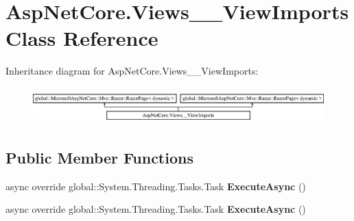 \hypertarget{class_asp_net_core_1_1_views_____view_imports}{}\section{Asp\+Net\+Core.\+Views\+\_\+\+\_\+\+View\+Imports Class Reference}
\label{class_asp_net_core_1_1_views_____view_imports}
Inheritance diagram for Asp\+Net\+Core.\+Views\+\_\+\+\_\+\+View\+Imports\+:\begin{figure}[H]
\begin{center}
\leavevmode
\includegraphics[height=1.432225cm]{class_asp_net_core_1_1_views_____view_imports}
\end{center}
\end{figure}
\subsection*{Public Member Functions}
\begin{DoxyCompactItemize}
\item 
\mbox{\label{class_asp_net_core_1_1_views_____view_imports_afb0fbe4d2cff8ff940fd8555b3f3c64e}} 
async override global\+::\+System.\+Threading.\+Tasks.\+Task {\bfseries Execute\+Async} ()
\item 
\mbox{\label{class_asp_net_core_1_1_views_____view_imports_afb0fbe4d2cff8ff940fd8555b3f3c64e}} 
async override global\+::\+System.\+Threading.\+Tasks.\+Task {\bfseries Execute\+Async} ()
\end{DoxyCompactItemize}
